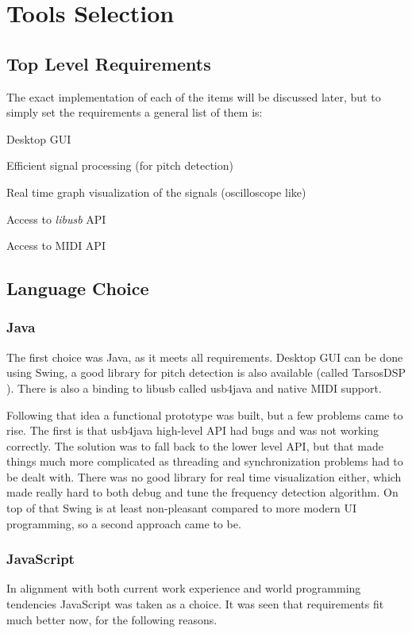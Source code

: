 \section{Tools Selection}
\label{tools-selection}

\subsection{Top Level Requirements}
The exact implementation of each of the items will be discussed later, but to
simply set the requirements a general list of them is:

\begin{itemlist}
  \item Desktop GUI
  \item Efficient signal processing (for pitch detection)
  \item Real time graph visualization of the signals (oscilloscope like)
  \item Access to \textit{libusb} \cite{libusb} API
  \item Access to MIDI API
\end{itemlist}

\subsection{Language Choice}

\subsubsection{Java}
The first choice was Java, as it meets all requirements. Desktop GUI can be done
using Swing, a good library for pitch detection is also available (called TarsosDSP \cite{TarsosDSP}).
There is also a binding to libusb called usb4java and native MIDI support. 

Following that idea a functional prototype was built, but a few problems came to rise.
The first is that usb4java high-level API had bugs and was not working correctly.
The solution was to fall back to the lower level API, but that made things much
more complicated as threading and synchronization problems had to be dealt with.
There was no good library for
real time visualization either, which made really hard to both debug and tune the
frequency detection algorithm. On top of that Swing is at least non-pleasant
compared to more modern UI programming, so a second approach came to be.

\subsubsection{JavaScript}
In alignment with both current work experience and world programming tendencies
JavaScript was taken as a choice. It was seen that requirements fit much better now,
for the following reasons. 

